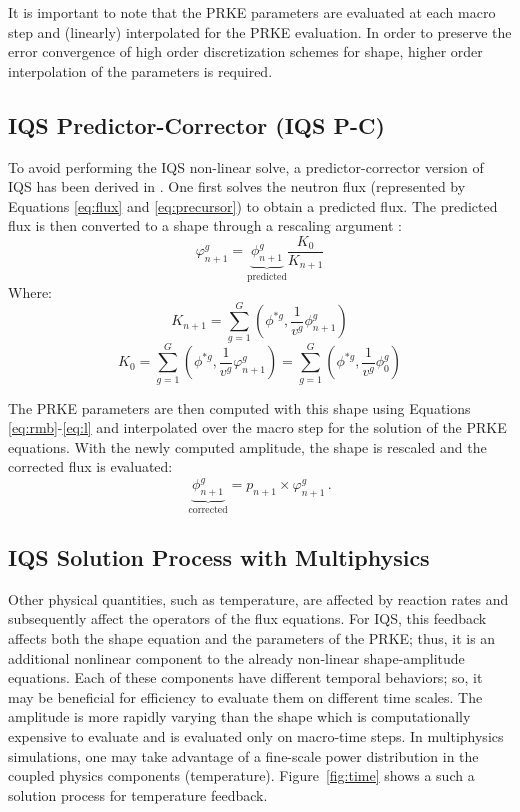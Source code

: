 \documentclass{anstrans}
\newcommand{\be}{\begin{equation}}
\newcommand{\ee}{\end{equation}}
\begin{document}
It is important to note that the PRKE parameters are evaluated at each macro step and (linearly) interpolated for the PRKE evaluation. In order to preserve the error convergence of high order discretization schemes for shape, higher order interpolation of the parameters is required.

\subsection{IQS Predictor-Corrector (IQS P-C)}

To avoid performing the IQS non-linear solve, a predictor-corrector version of IQS has been derived in \cite{Dulla2008}. One first solves the neutron flux (represented by Equations \ref{eq:flux} and \ref{eq:precursor}) to obtain a predicted flux. The predicted flux is then converted to a shape through a rescaling argument :
\be
\varphi^g_{n+1} = \underbrace{\phi^g_{n+1}}_{\text{predicted}} \frac{K_0}{K_{n+1}}
\label{eq:rescale}
\ee
Where:
\be
K_{n+1} =\sum_{g=1}^G\left(\phi^{*g},\frac{1}{v^g}\phi^g_{n+1}\right)
\ee
\be
K_{0} =\sum_{g=1}^G\left(\phi^{*g},\frac{1}{v^g}\varphi^g_{n+1}\right)=\sum_{g=1}^G\left(\phi^{*g},\frac{1}{v^g}\phi^g_{0}\right)
\ee

The PRKE parameters are then computed with this shape using Equations \eqref{eq:rmb}-\eqref{eq:l} and interpolated over the macro step for the solution of the PRKE equations.  With the newly computed amplitude, the shape is rescaled and the corrected flux is evaluated:
\be
\underbrace{\phi^g_{n+1}}_{\text{corrected}} = p_{n+1} \times \varphi^g_{n+1} \,.
\ee

\subsection{IQS Solution Process with Multiphysics}

Other physical quantities, such as temperature, are affected by reaction rates and subsequently affect the operators of the flux equations. 
For IQS, this feedback affects both the shape equation and the parameters of the PRKE; thus, it is an additional nonlinear component to the 
already non-linear shape-amplitude equations.  Each of these components have different temporal behaviors; so, it may be beneficial for 
efficiency to evaluate them on different time scales.  The amplitude is more rapidly varying than the shape which is computationally expensive to evaluate 
and is evaluated only on macro-time steps. In multiphysics simulations, one may take advantage of a fine-scale power distribution in the coupled 
physics components (temperature). Figure~\ref{fig:time} shows a such a solution process for temperature feedback.
\end{document}

